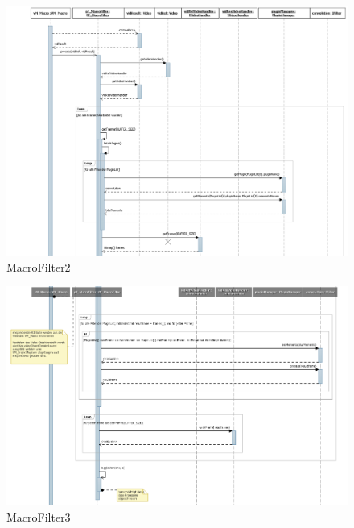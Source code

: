 \begin{figure}[H]
\includegraphics[width=\linewidth]{bilder/Sequenzdiagramm/Macro2.png}
\caption{MacroFilter2}
\end{figure}

\begin{figure}[H]
\includegraphics[width=\linewidth]{bilder/Sequenzdiagramm/Macro3.png}
\caption{MacroFilter3}
\end{figure}

